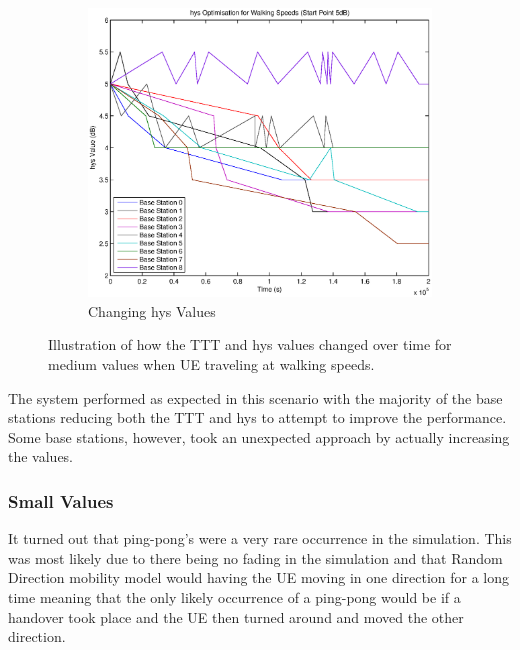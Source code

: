\begin{figure}[H]
\begin{subfigure}[b]{0.49\textwidth}
                \includegraphics[width=\textwidth]{figures/walking_figures/mid/long_hys.eps}
                \caption{Changing hys Values}
                \label{fig:walk_mid_hys}
        \end{subfigure}
        \caption{Illustration of how the TTT and hys values changed over time for medium values when UE traveling at walking speeds.}\label{fig:walk_mid_ttthys}
\end{figure}
The system performed as expected in this scenario with the majority of the base stations reducing both the TTT and hys to attempt to improve the performance. Some base stations, however, took an unexpected approach by actually increasing the values.
\subsubsection*{Small Values}
It turned out that ping-pong's were a very rare occurrence in the simulation. This was most likely due to there being no fading in the simulation and that Random Direction mobility model would having the UE moving in one direction for a long time meaning that the only likely occurrence of a ping-pong would be if a handover took place and the UE then turned around and moved the other direction.

